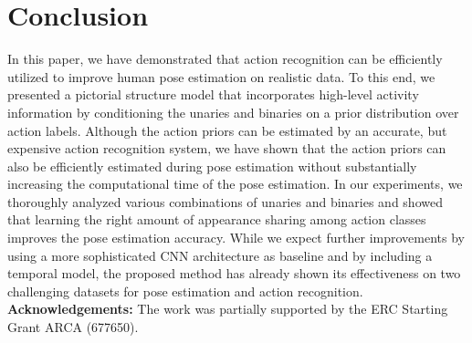 \documentclass[a4paper, 10pt, conference]{ieeeconf}      \usepackage{FG2017}
\begin{document}
\begin{table}[t]
  \centering
  \footnotesize
\def\arraystretch{1}

  \caption{Comparison of action recognition accuracy with the state-of-the-art approaches on sub-J-HMDB and Penn-Action datasets. }
  \label{tab:AR_JHMDB}
\end{table}


\section{Conclusion}

In this paper, we have demonstrated that action recognition can be efficiently utilized to improve human pose estimation on realistic data. To this end, we presented a pictorial structure model that incorporates high-level activity information 
by conditioning the unaries and binaries on a prior distribution over action labels. Although the action priors can be estimated by an accurate, but expensive action recognition system, we have shown that the action priors can also be efficiently estimated during pose estimation without substantially increasing the computational time of the pose estimation. In our experiments, we thoroughly analyzed various combinations of unaries and binaries and showed that learning the right amount of appearance sharing among action classes improves the pose estimation accuracy. While we expect further improvements by using a more sophisticated CNN architecture as baseline and by including a temporal model, the proposed method has already shown its effectiveness on two challenging datasets for pose estimation and action recognition.  \\


\noindent\textbf{Acknowledgements:} The work was partially supported by the ERC Starting Grant ARCA (677650).




\end{document}
